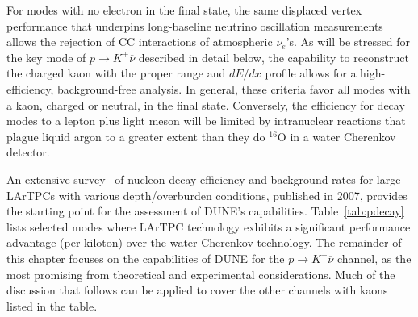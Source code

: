 For modes with no
electron in the final state, the same displaced vertex performance
that underpins long-baseline neutrino oscillation measurements allows
the rejection of CC interactions of atmospheric $\nu_e$'s.
As will be stressed for the key mode of $p \rightarrow K^+ \overline{\nu}$
described in detail below, the capability to reconstruct the charged
kaon with the proper range and $dE/dx$ profile allows for a high-efficiency,
background-free analysis.  In general, these criteria favor all
modes with a kaon, charged or neutral, in the final state. Conversely,
the efficiency for decay modes to a lepton plus light meson will be
limited by intranuclear reactions that plague liquid argon to a greater extent
than they do $^{\mathrm{16}}$O in a water Cherenkov detector.

An extensive survey~\cite{Bueno:2007um} of nucleon decay efficiency 
and background rates for large LArTPCs with various depth/overburden 
conditions, published in 2007, provides the starting point for the 
assessment of DUNE's capabilities.  Table~\ref{tab:pdecay} lists selected
modes where LArTPC technology exhibits a significant performance 
advantage (per kiloton) over the water Cherenkov technology.
The remainder of this chapter focuses on the capabilities 
of DUNE for the $p\to K^+\overline{\nu}$ channel, as the most 
promising from theoretical and experimental 
considerations.  Much of the discussion that follows can be 
applied to cover the other channels with kaons listed in 
the table.
%
\begin{table}[!htbp]
\caption[Efficiencies and background rates for nucleon decay modes]
        {Efficiencies and background rates (events per \SI{}{\Mtyr}) for nucleon decay 
         channels of interest for a large underground LArTPC~\cite{Bueno:2007um}, and 
         comparison with water Cherenkov detector capabilities.  
         The entries for the water Cherenkov capabilities are based 
         on experience with the \superk{} detector~\cite{kearns_isoups}.  
        }
\begin{center}
\end{center}
\label{tab:pdecay}
\end{table}
%

